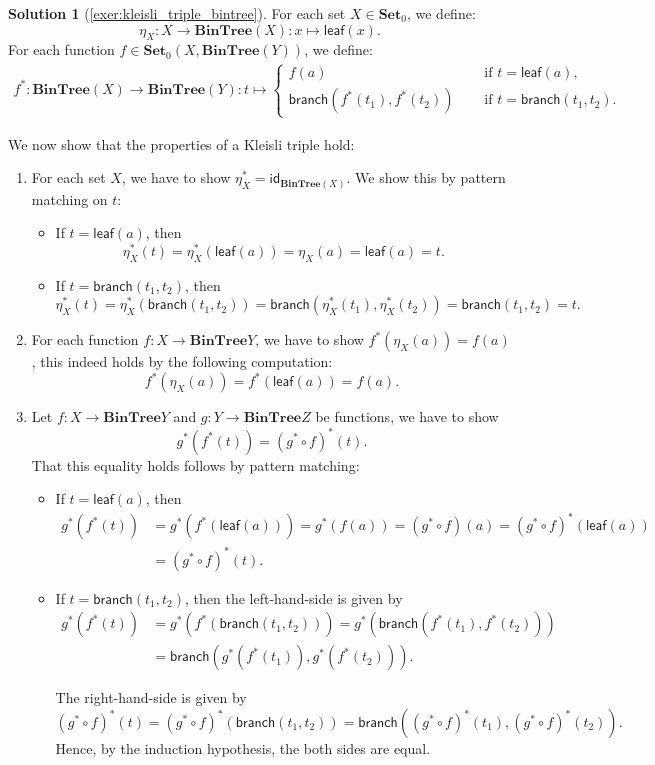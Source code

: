 \documentclass[a4paper,11pt, oneside,titlepage=false]{scrbook}
\theoremstyle{plain}
\theoremstyle{definition}
\newtheorem{solution}[thm]{Solution}
\newcommand{\cfont}[1]{\ensuremath{\mathsf{#1}}}
\newcommand{\Catb}[1]{\mathbf{#1}}
\newcommand{\BinTree}{\Catb{BinTree}}
\newcommand{\SET}{\Catb{Set}}
\newcommand{\Ob}[1]{{#1}_0}
\newcommand{\CHom}[3]{{#1}(#2,#3)}
\newcommand{\Id}[1][]{\cfont{id}_{#1}}
\newcommand{\co}[2]{\ensuremath{#2 \circ #1}}
\newcommand{\Leaf}[1]{\ensuremath{\mathsf{leaf}(#1)}}
\newcommand{\Branch}[2]{\ensuremath{\mathsf{branch}(#1, #2)}}
\begin{document}
\begin{solution}[\cref{exer:kleisli_triple_bintree}]
\label{sol:kleisli_triple_bintree}
For each set $X\in\Ob \SET$, we define:
\[
\eta_X : X \to \BinTree(X) : x\mapsto \Leaf x.
\]
For each function $f\in\CHom{\Ob \SET}{X}{\BinTree(Y)}$, we define:
\begin{align*}
f^{*} : \BinTree(X) \to \BinTree(Y) : t \mapsto
\begin{cases}
f(a) &\quad \text{ if } t=\Leaf a,\\
\Branch{f^{*}(t_1)}{f^{*}(t_2)} &\quad \text{ if } t=\Branch{t_1}{t_2}.
\end{cases}
\end{align*}

We now show that the properties of a Kleisli triple hold:
\begin{enumerate}
\item For each set $X$, we have to show $\eta_X^{*} = \Id[\BinTree(X)]$. We show this by pattern matching on $t$:
\begin{itemize}
\item If $t=\Leaf a$, then
\[
\eta_X^{*}(t) = \eta_X^{*}(\Leaf{a}) = \eta_X(a) = \Leaf{a} = t.
\]
\item If $t=\Branch{t_1}{t_2}$, then
\[
\eta_X^{*}(t) = \eta_X^{*}(\Branch{t_1}{t_2}) = \Branch{\eta_X^{*}(t_1)}{\eta_X^{*}(t_2)} = \Branch{t_1}{t_2} = t.
\]
\end{itemize}

\item For each function $f:X\to \BinTree Y$, we have to show $f^{*}(\eta_X(a)) = f(a)$, this indeed holds by the following computation:
\[
f^{*}(\eta_X(a)) = f^{*}(\Leaf{a}) = f(a).
\]

\item Let $f:X\to \BinTree Y$ and $g:Y\to \BinTree Z$ be functions, we have to show
\[
g^{*}(f^{*}(t)) = (\co{f}{g^{*}})^{*}(t).
\]
That this equality holds follows by pattern matching:
\begin{itemize}
\item If $t= \Leaf{a}$, then
\begin{align*}
	g^{*}(f^{*}(t)) & = g^{*}(f^{*}(\Leaf{a})) = g^{*}(f(a)) = (\co{f}{g^{*}})(a) = (\co{f}{g^{*}})^{*}(\Leaf{a}) \\
	& = (\co{f}{g^{*}})^{*}(t).
\end{align*}

\item If $t=\Branch{t_1}{t_2}$, then the left-hand-side is given by
\begin{align*}
	g^{*}(f^{*}(t)) & = g^{*}(f^{*}(\Branch{t_1}{t_2})) = g^{*}\left(\Branch{f^{*}(t_1)}{f^{*}(t_2)}\right) \\
	& = \Branch{g^{*}(f^{*}(t_1))}{g^{*}(f^{*}(t_2))}.
\end{align*}

The right-hand-side is given by
\[
(\co{f}{g^{*}})^{*}(t) = (\co{f}{g^{*}})^{*}(\Branch{t_1}{t_2}) = \Branch{(\co{f}{g^{*}})^{*}(t_1)}{(\co{f}{g^{*}})^{*}(t_2)}.
\]
Hence, by the induction hypothesis, the both sides are equal.
\end{itemize}

\end{enumerate}
\end{solution}
\end{document}

